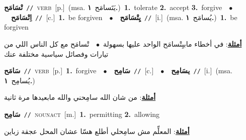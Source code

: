 \documentclass[10pt,a4paper,twoside]{article} %
\begin{document}
\begin{multicols}{2}
{\setlength\topsep{0pt}\textbf{\foreignlanguage{arabic}{تْسَامَح}}\ {\color{gray}\texttt{//}\color{black}}\ \textsc{verb}\ [p.]\ \color{gray}(msa. \foreignlanguage{arabic}{يَتَسامَح}~\foreignlanguage{arabic}{\textbf{١.}})\color{black}\ \textbf{1.}~tolerate  \textbf{2.}~accept  \textbf{3.}~forgive\ \ $\bullet$\ \ \setlength\topsep{0pt}\textbf{\foreignlanguage{arabic}{اِتْسَامَح}}\ {\color{gray}\texttt{//}\color{black}}\ [c.]\ \textbf{1.}~be forgiven\ \ $\bullet$\ \ \setlength\topsep{0pt}\textbf{\foreignlanguage{arabic}{يِتْسَامَح}}\ {\color{gray}\texttt{//}\color{black}}\ [i.]\ \color{gray}(msa. \foreignlanguage{arabic}{يُسامَح}~\foreignlanguage{arabic}{\textbf{١.}})\color{black}\ \textbf{1.}~be forgiven\  \begin{flushright}\color{gray}\foreignlanguage{arabic}{\textbf{\underline{\foreignlanguage{arabic}{أمثلة}}}: في أخطاء مابيِتْسامَح الواحد عليها بسهولة\ $\bullet$\ \  تْسامَح مع كل الناس اللي من تيارات وفصائل سياسية مختلفة عنك}\end{flushright}\color{black}} \vspace{2mm}

{\setlength\topsep{0pt}\textbf{\foreignlanguage{arabic}{سَامَح}}\ {\color{gray}\texttt{//}\color{black}}\ \textsc{verb}\ [p.]\ \textbf{1.}~forgive\ \ $\bullet$\ \ \setlength\topsep{0pt}\textbf{\foreignlanguage{arabic}{سَامِح}}\ {\color{gray}\texttt{//}\color{black}}\ [c.]\ \ $\bullet$\ \ \setlength\topsep{0pt}\textbf{\foreignlanguage{arabic}{يسَامِح}}\ {\color{gray}\texttt{//}\color{black}}\ [i.]\ \color{gray}(msa. \foreignlanguage{arabic}{يُسامِح}~\foreignlanguage{arabic}{\textbf{١.}})\color{black}\  \begin{flushright}\color{gray}\foreignlanguage{arabic}{\textbf{\underline{\foreignlanguage{arabic}{أمثلة}}}: من شان الله سامِحني والله مابعيدها مرة ثانية}\end{flushright}\color{black}} \vspace{2mm}

{\setlength\topsep{0pt}\textbf{\foreignlanguage{arabic}{سَامِح}}\ {\color{gray}\texttt{//}\color{black}}\ \textsc{noun\textunderscore act}\ [m.]\ \textbf{1.}~permitting  \textbf{2.}~allowing\  \begin{flushright}\color{gray}\foreignlanguage{arabic}{\textbf{\underline{\foreignlanguage{arabic}{أمثلة}}}: المعلِّم مش سامِحلي أطلع هسّا عشان المحل عجقة زباين}\end{flushright}\color{black}} \vspace{2mm}


\end{multicols}
\end{document}
